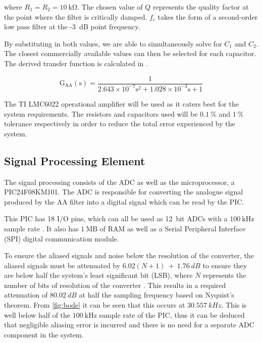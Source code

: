\documentclass[10pt,twocolumn]{witseiepaper}
\begin{document}
where $R_1 = R_2 = 10~\mathrm{k\Omega}$. The chosen value of $Q$ represents the quality factor at the point where the filter is critically damped. $f_c$ takes the form of a second-order low pass filter at the -3~dB point frequency.

By substituting in both values, we are able to simultaneously solve for $C_1$ and $C_2$. The closest commercially available values can then be selected for each capacitor. The derived transfer function is calculated in .

\begin{equation}
\mathrm{G_{AA}(s) = \frac{1}{2.643 \times 10^{-7} s^2 + 1.028 \times 10^{-3} s + 1} }
\label{eqn:aafilter}
\end{equation}

The TI LMC6022 operational amplifier will be used as it caters best for the system requirements. The resistors and capacitors used will be $0.1~\%$ and $1~\%$ tolerance respectively in order to reduce the total error experienced by the system.

\subsection{Signal Processing Element}

The signal processing consists of the ADC as well as the microprocessor, a PIC24F08KM101. The ADC is responsible for converting the analogue signal produced by the AA filter into a digital signal which can be read by the PIC.

This PIC has 18 I/O pins, which can all be used as 12~bit ADCs with a $100~\mathrm{kHz}$ sample rate \cite{PIC}. It also has $1~\mathrm{MB}$ of RAM as well as a Serial Peripheral Interface (SPI) digital communication module.

To ensure the aliased signals and noise below the resolution of the converter, the aliased signals must be attenuated by $6.02(N + 1)~+~1.76~dB$ to ensure they are below half the system's least significant bit (LSB), where $N$ represents the number of bits of resolution of the converter \cite{alias-error}. This results in a required attenuation of $80.02~dB$ at half the sampling frequency based on Nyquist's theorem. From \cref{fig:bode} it can be seen that this occurs at $30.557~kHz$. This is well below half of the $100~\mathrm{kHz}$ sample rate of the PIC, thus it can be deduced that negligible aliasing error is incurred and there is no need for a separate ADC component in the system.
\end{document}
